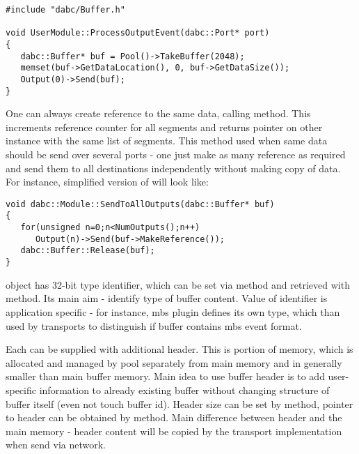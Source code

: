 \begin{small}
\begin{verbatim}     
#include "dabc/Buffer.h"

void UserModule::ProcessOutputEvent(dabc::Port* port)
{
   dabc::Buffer* buf = Pool()->TakeBuffer(2048);
   memset(buf->GetDataLocation(), 0, buf->GetDataSize());
   Output(0)->Send(buf);
}
\end{verbatim}     
\end{small}

One can always create reference to the same data, calling  method.
This increments reference counter for all segments and returns pointer on
other  instance with the same list of segments. This method used
when same data should be send over several ports - one just make as many reference 
as required and send them to all destinations independently without making copy of data.
For instance, simplified version of  will look like:  

\begin{small}
\begin{verbatim}     
void dabc::Module::SendToAllOutputs(dabc::Buffer* buf)
{
   for(unsigned n=0;n<NumOutputs();n++)
      Output(n)->Send(buf->MakeReference());
   dabc::Buffer::Release(buf);
}
\end{verbatim}     
\end{small}


 object has 32-bit type identifier, which can be set via
 method and retrieved with  method.
Its main aim - identify type of buffer content. Value of   
identifier is application specific - for instance, mbs plugin defines its own type,
which than used by transports to distinguish if buffer contains mbs event format.  

Each  can be supplied with additional header. This is portion of 
memory, which is allocated and managed by pool separately from main memory and 
in generally  smaller than main buffer memory. 
Main idea to use buffer header is to add user-specific
information to already existing buffer without changing structure of buffer itself
(even not touch buffer id). 
Header size can be set by  method, pointer to header can be
obtained by  method.
Main difference between header and the main memory - header content will be copied by 
the transport implementation when send via network. 



